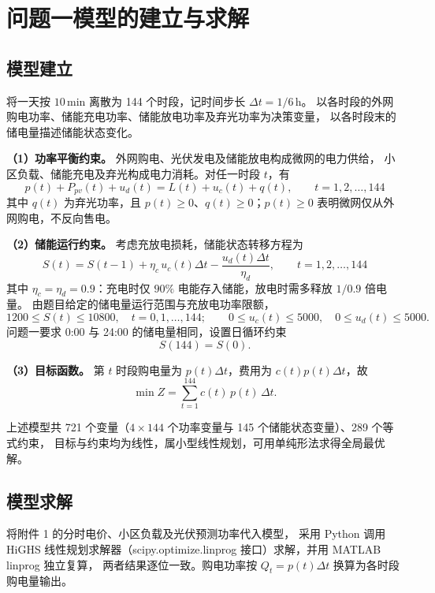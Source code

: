 \section{问题一模型的建立与求解}

\subsection{模型建立}
将一天按 $10\,$min 离散为 144 个时段，记时间步长 $\Delta t=1/6$\,h。
以各时段的外网购电功率、储能充电功率、储能放电功率及弃光功率为决策变量，
以各时段末的储电量描述储能状态变化。

\textbf{（1）功率平衡约束。} 外网购电、光伏发电及储能放电构成微网的电力供给，
小区负载、储能充电及弃光构成电力消耗。对任一时段 $t$，有
\begin{equation}
p(t)+P_{pv}(t)+u_d(t)=L(t)+u_c(t)+q(t),\qquad t=1,2,\dots,144
\end{equation}
其中 $q(t)$ 为弃光功率，且 $p(t)\ge0$、$q(t)\ge0$；$p(t)\ge0$ 表明微网仅从外网购电，不反向售电。

\textbf{（2）储能运行约束。} 考虑充放电损耗，储能状态转移方程为
\begin{equation}
S(t)=S(t-1)+\eta_c\,u_c(t)\Delta t-\dfrac{u_d(t)\Delta t}{\eta_d},\qquad t=1,2,\dots,144
\end{equation}
其中 $\eta_c=\eta_d=0.9$：充电时仅 $90\%$ 电能存入储能，放电时需多释放 $1/0.9$ 倍电量。
由题目给定的储电量运行范围与充放电功率限额，
\begin{equation}
1200\le S(t)\le 10800,\quad t=0,1,\dots,144;\qquad
0\le u_c(t)\le 5000,\quad 0\le u_d(t)\le 5000 .
\end{equation}
问题一要求 0:00 与 24:00 的储电量相同，设置日循环约束
\begin{equation}
S(144)=S(0).
\end{equation}

\textbf{（3）目标函数。} 第 $t$ 时段购电量为 $p(t)\Delta t$，费用为 $c(t)p(t)\Delta t$，故
\begin{equation}
\min Z=\sum_{t=1}^{144} c(t)\,p(t)\,\Delta t .
\end{equation}

上述模型共 721 个变量（$4\times144$ 个功率变量与 145 个储能状态变量）、289 个等式约束，
目标与约束均为线性，属小型线性规划，可用单纯形法求得全局最优解。

\subsection{模型求解}
将附件 1 的分时电价、小区负载及光伏预测功率代入模型，
采用 Python 调用 HiGHS 线性规划求解器（scipy.optimize.linprog 接口）求解，并用 MATLAB linprog 独立复算，
两者结果逐位一致。购电功率按 $Q_t=p(t)\Delta t$ 换算为各时段购电量输出。

